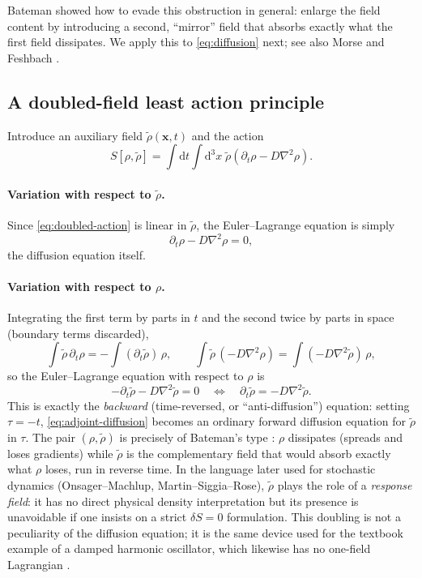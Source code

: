 \documentclass[11pt]{article}
\newcommand{\rd}{\mathrm{d}}
\newcommand{\lap}{\nabla^2}
\newcommand{\bx}{\mathbf{x}}
\begin{document}
Bateman \cite{Bateman1931} showed how to evade this obstruction in general: enlarge the field content by introducing a second, ``mirror'' field that absorbs exactly what the first field dissipates. We apply this to \eqref{eq:diffusion} next; see also Morse and Feshbach \cite{MorseFeshbach1953}.

\subsection{A doubled-field least action principle}
\label{sec:doubled}

Introduce an auxiliary field $\tilde\rho(\bx,t)$ and the action
\begin{equation}
S[\rho,\tilde\rho] = \int \rd t\int \rd^3x\; \tilde\rho\left(\partial_t \rho - D\lap\rho\right). \label{eq:doubled-action}
\end{equation}

\paragraph{Variation with respect to $\tilde\rho$.} Since \eqref{eq:doubled-action} is linear in $\tilde\rho$, the Euler--Lagrange equation is simply
\begin{equation}
\partial_t \rho - D\lap \rho = 0,
\end{equation}
the diffusion equation itself.

\paragraph{Variation with respect to $\rho$.} Integrating the first term by parts in $t$ and the second twice by parts in space (boundary terms discarded),
\begin{equation}
\int \tilde\rho\,\partial_t\rho = -\int (\partial_t\tilde\rho)\,\rho, \qquad \int \tilde\rho\,(-D\lap\rho) = \int(-D\lap\tilde\rho)\,\rho,
\end{equation}
so the Euler--Lagrange equation with respect to $\rho$ is
\begin{equation}
-\partial_t\tilde\rho - D\lap\tilde\rho = 0 \quad\Longleftrightarrow\quad \partial_t\tilde\rho = -D\lap\tilde\rho. \label{eq:adjoint-diffusion}
\end{equation}
This is exactly the \emph{backward} (time-reversed, or ``anti-diffusion'') equation: setting $\tau=-t$, \eqref{eq:adjoint-diffusion} becomes an ordinary forward diffusion equation for $\tilde\rho$ in $\tau$. The pair $(\rho,\tilde\rho)$ is precisely of Bateman's type \cite{Bateman1931}: $\rho$ dissipates (spreads and loses gradients) while $\tilde\rho$ is the complementary field that would absorb exactly what $\rho$ loses, run in reverse time. In the language later used for stochastic dynamics (Onsager--Machlup, Martin--Siggia--Rose), $\tilde\rho$ plays the role of a \emph{response field}: it has no direct physical density interpretation but its presence is unavoidable if one insists on a strict $\delta S=0$ formulation. This doubling is not a peculiarity of the diffusion equation; it is the same device used for the textbook example of a damped harmonic oscillator, which likewise has no one-field Lagrangian \cite{Bateman1931}.
\end{document}
